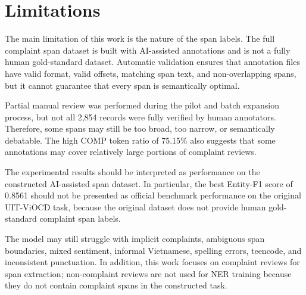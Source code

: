 \documentclass[11pt]{article}
\begin{document}
\section*{Limitations}

The main limitation of this work is the nature of the span labels. The full complaint span dataset is built with AI-assisted annotations and is not a fully human gold-standard dataset. Automatic validation ensures that annotation files have valid format, valid offsets, matching span text, and non-overlapping spans, but it cannot guarantee that every span is semantically optimal.

Partial manual review was performed during the pilot and batch expansion process, but not all 2,854 records were fully verified by human annotators. Therefore, some spans may still be too broad, too narrow, or semantically debatable. The high COMP token ratio of 75.15\% also suggests that some annotations may cover relatively large portions of complaint reviews.

The experimental results should be interpreted as performance on the constructed AI-assisted span dataset. In particular, the best Entity-F1 score of 0.8561 should not be presented as official benchmark performance on the original UIT-ViOCD task, because the original dataset does not provide human gold-standard complaint span labels.

The model may still struggle with implicit complaints, ambiguous span boundaries, mixed sentiment, informal Vietnamese, spelling errors, teencode, and inconsistent punctuation. In addition, this work focuses on complaint reviews for span extraction; non-complaint reviews are not used for NER training because they do not contain complaint spans in the constructed task.


\end{document}
